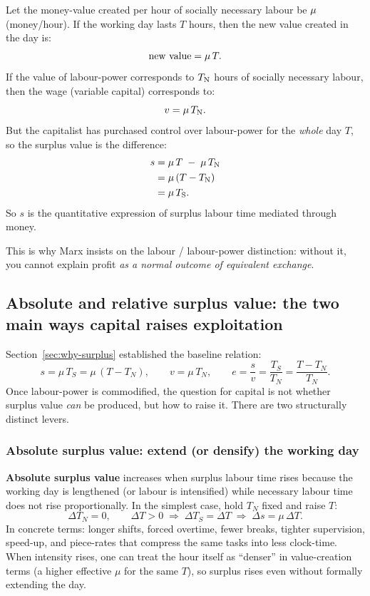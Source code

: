 Let the money-value created per hour of socially necessary labour be $\mu$ (money/hour).
If the working day lasts $T$ hours, then the new value created in the day is:
\[
  \text{new value} = \mu \, T.
\]
If the value of labour-power corresponds to $T_{\mathrm{N}}$ hours of socially necessary labour,
then the wage (variable capital) corresponds to:
\[
  v = \mu \, T_{\mathrm{N}}.
\]
But the capitalist has purchased control over labour-power for the \emph{whole} day $T$,
so the surplus value is the difference:
\begin{align*}
  s
  &= \mu \, T \;-\; \mu \, T_{\mathrm{N}} \\
  &= \mu \, (T - T_{\mathrm{N}}) \\
  &= \mu \, T_{\mathrm{S}}.
\end{align*}
So $s$ is the quantitative expression of surplus labour time mediated through money.

This is why Marx insists on the labour / labour-power distinction: without it, you
cannot explain profit \emph{as a normal outcome of equivalent exchange}.

\subsection{Absolute and relative surplus value: the two main ways capital raises exploitation}
\label{sec:absolute-relative-surplus}

Section~\ref{sec:why-surplus} established the baseline relation:
\[
  s = \mu\,T_S=\mu\,(T-T_N),
  \qquad
  v=\mu\,T_N,
  \qquad
  e=\frac{s}{v}=\frac{T_S}{T_N}=\frac{T-T_N}{T_N}.
\]
Once labour-power is commodified, the question for capital is not whether surplus value
\emph{can} be produced, but how to raise it. There are two structurally distinct levers.

\subsubsection*{Absolute surplus value: extend (or densify) the working day}

\textbf{Absolute surplus value} increases when surplus labour time rises because the working day
is lengthened (or labour is intensified) while necessary labour time does not rise proportionally.
In the simplest case, hold $T_N$ fixed and raise $T$:
\[
  \Delta T_N = 0,
  \qquad
  \Delta T > 0
  \;\Rightarrow\;
  \Delta T_S = \Delta T
  \;\Rightarrow\;
  \Delta s = \mu\,\Delta T.
\]
In concrete terms: longer shifts, forced overtime, fewer breaks, tighter supervision, speed-up,
and piece-rates that compress the same tasks into less clock-time. When intensity rises, one can
treat the hour itself as “denser” in value-creation terms (a higher effective $\mu$ for the same $T$),
so surplus rises even without formally extending the day.

